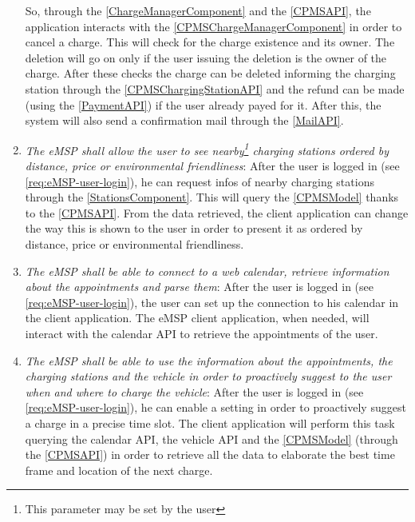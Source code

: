 \begin{enumerate}[label=\textbf{R\arabic*}]
    So, through the \ref{ChargeManagerComponent} and the \ref{CPMSAPI}, the application interacts with the \ref{CPMSChargeManagerComponent} in order to cancel a charge. This will check for the charge existence and its owner. The deletion will go on only if the user issuing the deletion is the owner of the charge.
    After these checks the charge can be deleted informing the charging station through the \ref{CPMSChargingStationAPI} and the refund can be made (using the \ref{PaymentAPI}) if the user already payed for it.
    After this, the system will also send a confirmation mail through the \ref{MailAPI}.
    \label{req:eMSP-refund}
    \item \textit{The \ac{eMSP} shall allow the user to see nearby\footnote{This parameter may be set by the user} charging stations ordered by distance, price or environmental friendliness}:
    After the user is logged in (see \ref{req:eMSP-user-login}), he can request infos of nearby charging stations through the \ref{StationsComponent}. This will query the \ref{CPMSModel} thanks to the \ref{CPMSAPI}. From the data retrieved, the client application can change the way this is shown to the user in order to present it as ordered by distance, price or environmental friendliness.
    \label{req:eMSP-see-stations}
    \item \textit{The \ac{eMSP} shall be able to connect to a web calendar, retrieve information about the appointments and parse them}:
    After the user is logged in (see \ref{req:eMSP-user-login}), the user can set up the connection to his calendar in the client application. The \ac{eMSP} client application, when needed, will interact with the calendar API to retrieve the appointments of the user.
    \label{req:eMSP-connect-calendar}
    \item \textit{The \ac{eMSP} shall be able to use the information about the appointments, the charging stations and the vehicle in order to proactively suggest to the user when and where to charge the vehicle}:
    After the user is logged in (see \ref{req:eMSP-user-login}), he can enable a setting in order to proactively suggest a charge in a precise time slot. 
    The client application will perform this task querying the calendar API, the vehicle API and the \ref{CPMSModel} (through the \ref{CPMSAPI}) in order to retrieve all the data to elaborate the best time frame and location of the next charge.

\end{enumerate}

